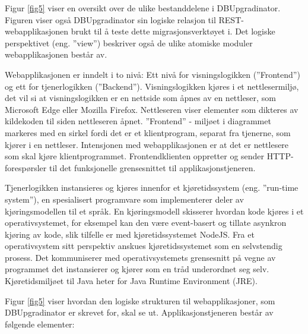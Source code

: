 
Figur \ref{fig5} viser en oversikt over de ulike bestanddelene i DBUpgradinator. Figuren viser også DBUpgradinator sin logiske relasjon til REST-webapplikasjonen brukt til å teste dette migrasjonsverktøyet i. Det logiske perspektivet (eng. ''view'') beskriver også de ulike atomiske moduler webapplikasjonen består av.

Webapplikasjonen er inndelt i to nivå: Ett nivå for visningslogikken (''Frontend'') og ett for tjenerlogikken (''Backend''). Visningslogikken kjøres i et nettlesermiljø, det vil si at visningslogikken er en nettside som åpnes av en nettleser, som Microsoft Edge eller Mozilla Firefox. Nettleseren viser elementer som dikteres av kildekoden til siden nettleseren åpnet. ''Frontend'' - miljøet i diagrammet markeres med en sirkel fordi det er et klientprogram, separat fra tjenerne, som kjører i en nettleser. Intensjonen med webapplikasjonen er at det er nettlesere som skal kjøre klientprogrammet. Frontendklienten oppretter og sender HTTP-forespørsler til det funksjonelle grensesnittet til applikasjonstjeneren.

Tjenerlogikken instansieres og kjøres innenfor et kjøretidssystem (eng. ''run-time system''), en spesialisert programvare som implementerer deler av kjøringsmodellen til et språk. En kjøringsmodell skisserer hvordan kode kjøres i et operativsystemet, for eksempel kan den være event-basert og tillate asynkron kjøring av kode, slik tilfelle er med kjøretidssystemet NodeJS. Fra et operativsystem sitt perspektiv anskues kjøretidssystemet som en selvstendig prosess. Det kommuniserer med operativsystemets grensesnitt på vegne av programmet det instansierer og kjører som en tråd underordnet seg selv. Kjøretidsmiljøet til Java heter for Java Runtime Environment (JRE).

Figur \ref{fig5} viser hvordan den logiske strukturen til webapplikasjoner, som DBUpgradinator er skrevet for, skal se ut. Applikasjonstjeneren består av følgende elementer:

